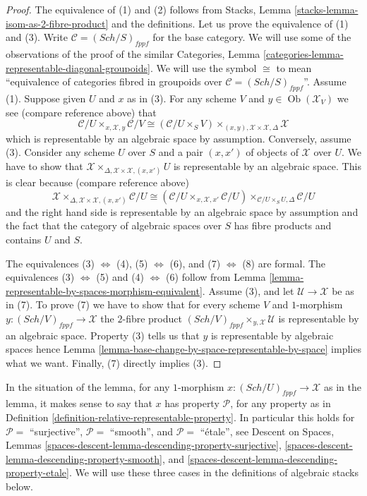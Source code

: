 \documentclass{stacks-project}
\theoremstyle{plain}
\theoremstyle{definition}
\theoremstyle{remark}
\numberwithin{equation}{subsection}
\def\Sch{\mathit{Sch}}
\def\Ob{\mathop{\mathrm{Ob}}\nolimits}
\begin{document}
\begin{proof}
The equivalence of (1) and (2) follows from
Stacks, Lemma \ref{stacks-lemma-isom-as-2-fibre-product}
and the definitions.
Let us prove the equivalence of (1) and (3).
Write $\mathcal{C} = (\Sch/S)_{fppf}$ for the base category.
We will use some of the observations of the proof of the similar
Categories, Lemma \ref{categories-lemma-representable-diagonal-groupoids}.
We will use the symbol $\cong$ to mean ``equivalence of categories fibred
in groupoids over $\mathcal{C} = (\Sch/S)_{fppf}$''.
Assume (1). Suppose given $U$ and $x$ as in (3). For any scheme $V$
and $y \in \Ob(\mathcal{X}_V)$ we see (compare reference above) that
$$
\mathcal{C}/U
\times_{x, \mathcal{X}, y}
\mathcal{C}/V
\cong
(\mathcal{C}/U \times_S V)
\times_{(x, y), \mathcal{X} \times \mathcal{X}, \Delta}
\mathcal{X}
$$
which is representable by an algebraic space by assumption. Conversely,
assume (3). Consider any scheme $U$ over $S$ and a pair $(x, x')$
of objects of $\mathcal{X}$ over $U$. We have to show that
$\mathcal{X} \times_{\Delta, \mathcal{X} \times \mathcal{X}, (x, x')} U$
is representable by an algebraic space. This is clear because
(compare reference above)
$$
\mathcal{X}
\times_{\Delta, \mathcal{X} \times \mathcal{X}, (x, x')}
\mathcal{C}/U
\cong
(\mathcal{C}/U \times_{x, \mathcal{X}, x'} \mathcal{C}/U)
\times_{\mathcal{C}/U \times_S U, \Delta}
\mathcal{C}/U
$$
and the right hand side is representable by an algebraic space by assumption
and the fact that the category of algebraic spaces over $S$ has fibre products
and contains $U$ and $S$.

\medskip\noindent
The equivalences
(3) $\Leftrightarrow$ (4),
(5) $\Leftrightarrow$ (6),
and
(7) $\Leftrightarrow$ (8)
are formal. The equivalences
(3) $\Leftrightarrow$ (5) and
(4) $\Leftrightarrow$ (6)
follow from
Lemma \ref{lemma-representable-by-spaces-morphism-equivalent}.
Assume (3), and let $\mathcal{U} \to \mathcal{X}$ be as in (7).
To prove (7) we have to show that for every scheme $V$ and $1$-morphism
$y : (\Sch/V)_{fppf} \to \mathcal{X}$ the $2$-fibre product
$(\Sch/V)_{fppf} \times_{y, \mathcal{X}} \mathcal{U}$
is representable by an algebraic space. Property (3) tells us
that $y$ is representable by algebraic spaces hence
Lemma \ref{lemma-base-change-by-space-representable-by-space}
implies what we want. Finally, (7) directly implies (3).
\end{proof}

\noindent
In the situation of the lemma, for any $1$-morphism
$x : (\Sch/U)_{fppf} \to \mathcal{X}$ as in the lemma, it makes sense
to say that $x$ has property $\mathcal{P}$, for any property as in
Definition \ref{definition-relative-representable-property}.
In particular this holds for
$\mathcal{P} = $ ``surjective'',
$\mathcal{P} = $ ``smooth'', and
$\mathcal{P} = $ ``\'etale'',
see
Descent on Spaces,
Lemmas \ref{spaces-descent-lemma-descending-property-surjective},
\ref{spaces-descent-lemma-descending-property-smooth}, and
\ref{spaces-descent-lemma-descending-property-etale}.
We will use these three cases in the definitions
of algebraic stacks below.
\end{document}
